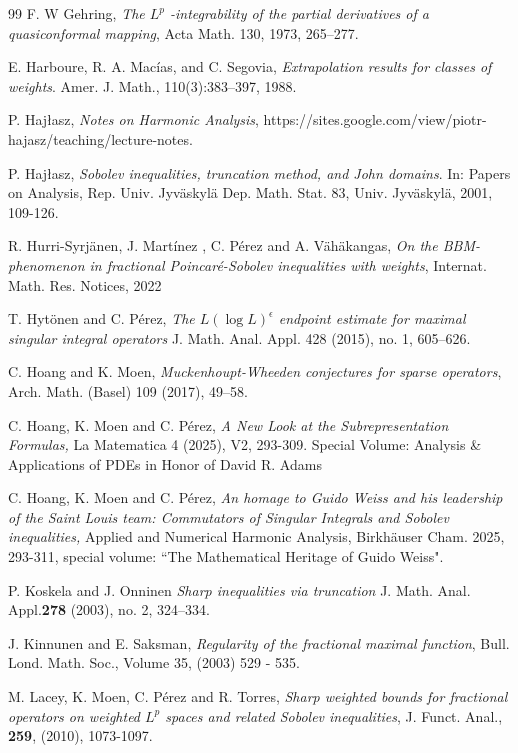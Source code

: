 \documentclass[11pt, a4paper, reqno]{amsart}
\newcommand{\ep}{\epsilon}
\theoremstyle{definition}
\theoremstyle{remark}
\begin{document}
\begin{thebibliography}{99}
 F. W Gehring, \emph{The $L^p$ -integrability of the partial derivatives of a quasiconformal mapping},  Acta Math. 130, 1973, 265–277.
 
 E. Harboure, R. A. Mac\'ias, and C. Segovia, \emph{Extrapolation results for classes of weights}. Amer. J. Math.,
110(3):383--397, 1988.

 P. Haj\l asz, \emph{Notes on Harmonic Analysis}, \textsf{https://sites.google.com/view/piotr-hajasz/teaching/lecture-notes}.

 P. Haj\l asz, \emph{Sobolev inequalities, truncation method, and John domains}. In: Papers on Analysis, Rep. Univ. Jyv\"askyl\"a Dep. Math. Stat. 83, Univ. Jyv\"askyl\"a, 2001, 109-126.

 R. Hurri-Syrj\"anen, J. Mart\'inez , C. P\'erez and A. V\"ah\"akangas, \emph{On the BBM-phenomenon in fractional Poincar\'e-Sobolev inequalities with weights}, Internat. Math. Res. Notices, 2022

 T. Hyt\"onen and C. P\'erez,  \emph{The $L(\log L)^\ep$ endpoint estimate for maximal singular integral operators} J. Math. Anal. Appl. 428 (2015), no. 1, 605--626.


 C. Hoang and K. Moen, \emph{Muckenhoupt-Wheeden conjectures for sparse operators}, Arch. Math. (Basel) 109 (2017), 49--58.


 C. Hoang, K. Moen and C. P\'erez,   \emph{ A New Look at the Subrepresentation Formulas,}   
La Matematica 4 (2025), V2, 293-309.  Special Volume: Analysis \& Applications of PDEs in Honor of David R. Adams

 C. Hoang, K. Moen and C. P\'erez, 
\emph{An homage to Guido Weiss and his leadership of the Saint Louis team: Commutators of Singular Integrals and Sobolev inequalities,} 
Applied and Numerical Harmonic Analysis, Birkh\"auser Cham. 2025, 293-311, special volume: ``The Mathematical Heritage of Guido Weiss".  


 P. Koskela and J. Onninen \emph{Sharp inequalities via truncation} J. Math. Anal. Appl.\textbf{278} (2003), no. 2, 324--334.

 J. Kinnunen and E. Saksman, \emph{Regularity of the fractional maximal function}, Bull. Lond. Math. Soc., Volume 35, (2003) 529 - 535.

 M. Lacey, K. Moen,   C. P\'erez and R. Torres, \emph{
Sharp weighted  bounds for fractional operators on weighted $L^p$ spaces and related Sobolev inequalities},  
J. Funct. Anal., \textbf{259},  (2010),  1073-1097. 



\end{thebibliography}
\end{document}
